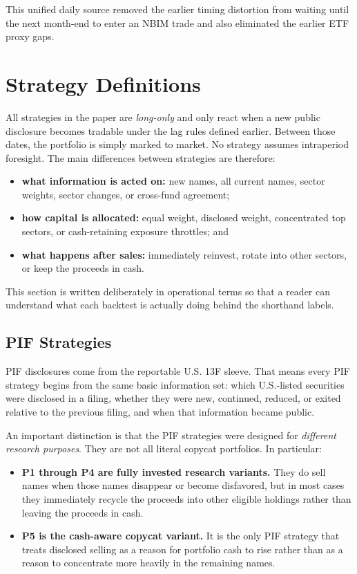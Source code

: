 \documentclass[conference]{IEEEtran}
\begin{document}
This unified daily source removed the earlier timing distortion from waiting until the next month-end to enter an NBIM trade and also eliminated the earlier ETF proxy gaps.

\section{Strategy Definitions}

All strategies in the paper are \emph{long-only} and only react when a new public disclosure becomes tradable under the lag rules defined earlier. Between those dates, the portfolio is simply marked to market. No strategy assumes intraperiod foresight. The main differences between strategies are therefore:
\begin{itemize}[leftmargin=1.4em]
    \item \textbf{what information is acted on:} new names, all current names, sector weights, sector changes, or cross-fund agreement;
    \item \textbf{how capital is allocated:} equal weight, disclosed weight, concentrated top sectors, or cash-retaining exposure throttles; and
    \item \textbf{what happens after sales:} immediately reinvest, rotate into other sectors, or keep the proceeds in cash.
\end{itemize}

This section is written deliberately in operational terms so that a reader can understand what each backtest is actually doing behind the shorthand labels.

\subsection{PIF Strategies}

PIF disclosures come from the reportable U.S. 13F sleeve. That means every PIF strategy begins from the same basic information set: which U.S.-listed securities were disclosed in a filing, whether they were new, continued, reduced, or exited relative to the previous filing, and when that information became public.

An important distinction is that the PIF strategies were designed for \emph{different research purposes}. They are not all literal copycat portfolios. In particular:
\begin{itemize}[leftmargin=1.4em]
    \item \textbf{P1 through P4 are fully invested research variants.} They do sell names when those names disappear or become disfavored, but in most cases they immediately recycle the proceeds into other eligible holdings rather than leaving the proceeds in cash.
    \item \textbf{P5 is the cash-aware copycat variant.} It is the only PIF strategy that treats disclosed selling as a reason for portfolio cash to rise rather than as a reason to concentrate more heavily in the remaining names.
\end{itemize}
\end{document}
